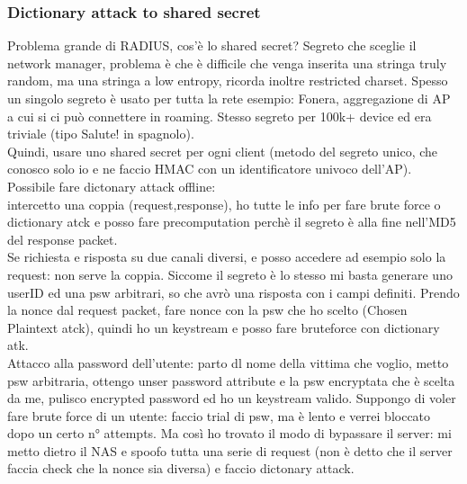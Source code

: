 \documentclass[16px]{article}
\begin{document}
\subsubsection{Dictionary attack to shared secret}
Problema grande di RADIUS, cos'è lo shared secret? Segreto che sceglie il network manager, problema è che è difficile che venga inserita una stringa truly random, ma una stringa a low entropy, ricorda inoltre restricted charset. Spesso un singolo segreto è usato per tutta la rete esempio: Fonera, aggregazione di AP a cui si ci può connettere in roaming. Stesso segreto per 100k+ device ed era triviale (tipo Salute! in spagnolo).\\ Quindi, usare uno shared secret per ogni client (metodo del segreto unico, che conosco solo io e ne faccio HMAC con un identificatore univoco dell'AP).\\ Possibile fare dictonary attack offline:\\ intercetto una coppia (request,response), ho tutte le info per fare brute force o dictionary atck e posso fare precomputation perchè il segreto è alla fine nell'MD5 del response packet.\\ Se richiesta e risposta su due canali diversi, e posso accedere ad esempio solo la request: non serve la coppia. Siccome il segreto è lo stesso mi basta generare uno userID ed una psw arbitrari, so che avrò una risposta con i campi definiti. Prendo la nonce dal request packet, fare nonce con la psw che ho scelto (Chosen Plaintext atck), quindi ho un keystream e posso fare bruteforce con dictionary atk.\\ Attacco alla password dell'utente: parto dl nome della vittima che voglio, metto psw arbitraria, ottengo unser password attribute e la psw encryptata che è scelta da me, pulisco encrypted password ed ho un keystream valido. Suppongo di voler fare brute force di un utente: faccio trial di psw, ma è lento e verrei bloccato dopo un certo n° attempts. Ma così ho trovato il modo di bypassare il server: mi metto dietro il NAS e spoofo tutta una serie di request (non è detto che il server faccia check che la nonce sia diversa) e faccio dictonary attack.
\end{document}
